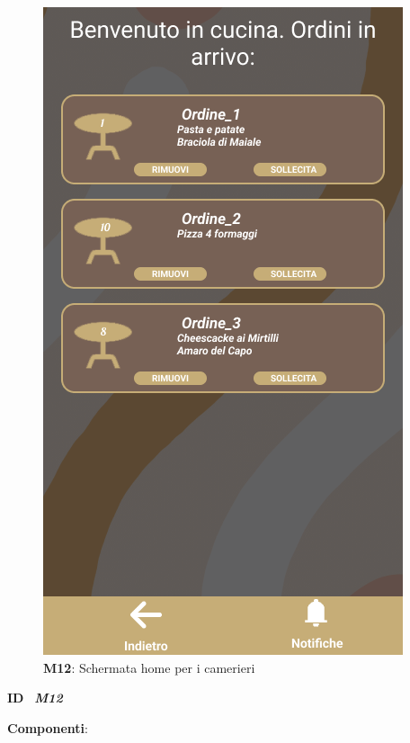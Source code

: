           \begin{figure}[H]
            \centering
            \includegraphics[scale=0.5]{assets/Mockup/Mockup_OrderStatus.png}
            \caption*{\textbf{M12}: Schermata home per i camerieri}\label{fig:Mockup_WaiterDash}
          \end{figure}

            \begin{flushleft}
              \textbf{ID}   \ \Large{\textit{\textbf{M12}}}
            \end{flushleft}
  
            \textbf{Componenti}:
            
